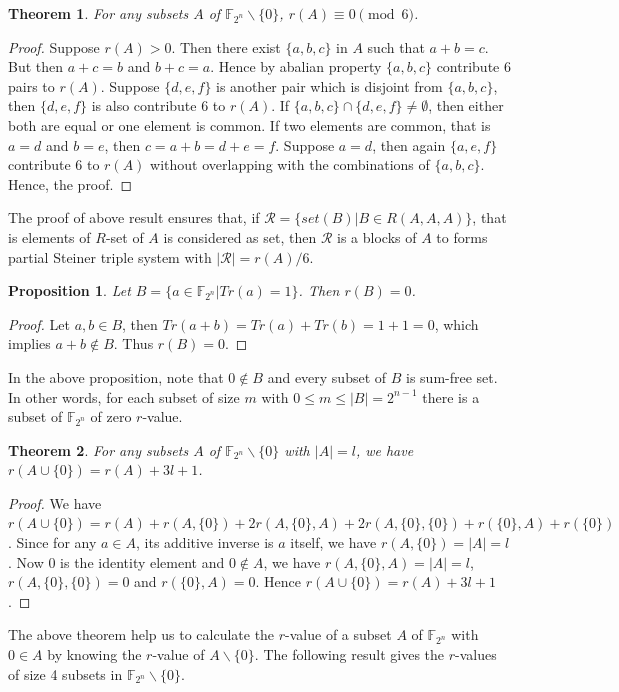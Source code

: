 \documentclass[12pt,a4paper]{article}
\newtheorem{prop}{Proposition}[section]
\newtheorem{thm}{Theorem}[section]
\begin{document}
	\begin{thm}\label{multiple_of_6}
		For any subsets $A$ of $\mathbb{F}_{2^n}\backslash\{0\}$, $r(A)\equiv0\pmod 6$.
	\end{thm}
	\begin{proof}
		Suppose $r(A)>0$. Then there exist $\{a,b,c\}$ in $A$ such that $a+b=c$. But then $a+c=b$ and $b+c=a$. Hence by abalian property $\{a,b,c\}$ contribute 6 pairs to $r(A)$. Suppose $\{d,e,f\}$ is another pair which is disjoint from $\{a,b,c\}$, then $\{d,e,f\}$ is also contribute 6 to $r(A)$. If $\{a,b,c\}\cap\{d,e,f\}\neq\emptyset$, then either both are equal or one element is common. If two elements are common, that is $a=d$ and $b=e$, then $c=a+b=d+e=f$. Suppose $a=d$, then again $\{a,e,f\}$ contribute 6 to $r(A)$ without overlapping with the combinations of $\{a,b,c\}$. Hence, the proof. 
	\end{proof}
	The proof of above result ensures that, if $\mathcal{R}=\{set(B)|B\in R(A,A,A)\}$, that is elements of $R$-set of $A$
	is considered as set, then $\mathcal{R}$ is a blocks of $A$ to forms partial Steiner triple system with $|\mathcal{R}|=r(A)/6$.
	
	
	\begin{prop}\label{sum_free}
		Let $B=\{a\in\mathbb{F}_{2^n}|Tr(a)=1\}$. Then $r(B)=0$.
	\end{prop}
	\begin{proof}
		Let $a,b\in B$, then $Tr(a+b)=Tr(a)+Tr(b)=1+1=0$, which implies $a+b\notin B$. Thus $r(B)=0$. 
	\end{proof}
	In the above proposition, note that $0\notin B$ and every subset of $B$ is sum-free set.  In other words, for each subset of size $m$ with $0\leq m\leq |B|=2^{n-1}$ there is a subset of $\mathbb{F}_{2^n}$ of zero  $r$-value.
	
	\begin{thm}\label{zero_added}
		For any subsets $A$ of $\mathbb{F}_{2^n}\backslash\{0\}$ with $|A|=l$, we have $r(A\cup\{0\})=r(A)+3l+1$.
	\end{thm}
	\begin{proof}
		We have $r(A\cup\{0\})=r(A)+r(A,\{0\})+2r(A,\{0\},A)+2r(A,\{0\},\{0\})+r(\{0\},A)+r(\{0\})$. Since for any $a\in A$, its additive inverse is $a$ itself, we have $r(A,\{0\})=|A|=l$. Now 0 is the identity element and $0\notin A$, we have $r(A,\{0\},A)=|A|=l$, $r(A,\{0\},\{0\})=0$ and $r(\{0\},A)=0$. Hence $r(A\cup\{0\})=r(A)+3l+1$.
	\end{proof}
	The above theorem help us to calculate the $r$-value of a subset $A$ of $\mathbb{F}_{2^n}$ with $0\in A$ by knowing the $r$-value of $A\backslash\{0\}$. The following result gives the $r$-values of size 4 subsets in $\mathbb{F}_{2^n}\backslash\{0\}$. 
	
\end{document}
